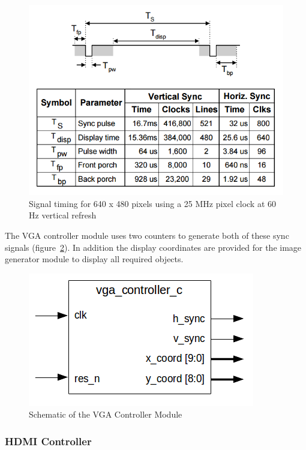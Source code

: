 	        \begin{figure}[h]
		        \centering
		        \includegraphics[scale=0.4]{images/vga_timing.png}
		        \caption{Signal timing for 640 x 480 pixels using a 25 MHz pixel clock at 60 Hz vertical refresh}
		        \label{vga_timing}
	        \end{figure}
            The VGA controller module uses two counters to generate both of these sync signals (figure~\ref{vga_sch}). In addition the display coordinates are provided for the image generator module to display all required objects.
	        \begin{figure}[h]
		        \centering
		        \includegraphics[scale=0.7]{images/vga_schematic.png}
		        \caption{Schematic of the VGA Controller Module}
		        \label{vga_sch}
	        \end{figure}

        \subsubsection{HDMI Controller}
